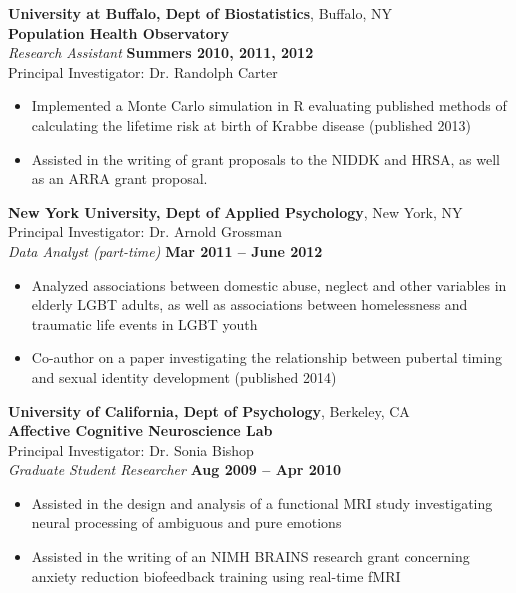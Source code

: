 \documentclass{article}
\begin{document}
 {\bf University at Buffalo, Dept of Biostatistics}, Buffalo, NY\\
 {\bf Population Health Observatory}\\
 {\it Research Assistant} \hfill {\bf Summers 2010, 2011, 2012} \\
 Principal Investigator: Dr. Randolph Carter
 \begin{itemize} \itemsep -2pt
  \item Implemented a Monte Carlo simulation in R evaluating published 
        methods of calculating the lifetime risk at birth of Krabbe disease
        (published 2013)
  \item Assisted in the writing of grant proposals to the NIDDK and HRSA,
        as well as an ARRA grant proposal.
 \end{itemize}

 {\bf New York University, Dept of Applied Psychology}, New York, NY\\
 Principal Investigator: Dr. Arnold Grossman\\
 {\it Data Analyst (part-time)} \hfill {\bf Mar 2011 -- June 2012}
 \begin{itemize} \itemsep -2pt
  \item Analyzed associations between domestic abuse, neglect and
        other variables in elderly LGBT adults, as well as associations
        between homelessness and traumatic life events in LGBT youth
  \item Co-author on a paper investigating the relationship between
        pubertal timing and sexual identity development (published 2014)
 \end{itemize}

 {\bf University of California, Dept of Psychology}, Berkeley, CA\\
 {\bf Affective Cognitive Neuroscience Lab}\\
 Principal Investigator: Dr. Sonia Bishop\\
 {\it Graduate Student Researcher} \hfill {\bf Aug 2009 -- Apr 2010}
 \begin{itemize} \itemsep -2pt
  \item Assisted in the design and analysis of a functional MRI study 
        investigating neural processing of ambiguous and pure emotions 
  \item Assisted in the writing of an NIMH BRAINS research grant concerning
        anxiety reduction biofeedback training using real-time fMRI
 \end{itemize}
\end{document}
